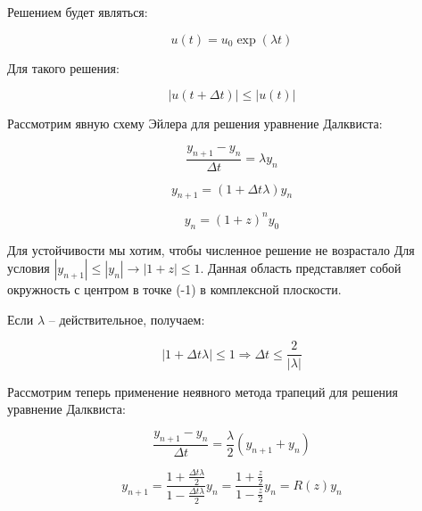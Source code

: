 \documentclass[10pt,a4paper]{article}
\begin{document}
		Решением будет являться:
		
		\begin{equation}
			u\left(t\right) = u_{0}\exp\left(\lambda t\right)
		\end{equation}
		
		Для такого решения:
		
		\begin{equation}
			\left|u\left(t + \Delta t\right)\right|\leqslant \left|
			u\left(t\right)\right|
		\end{equation}
		
		Рассмотрим явную схему Эйлера для решения уравнение Далквиста:
		
		\begin{equation}
			\frac{y_{n + 1} - y_{n}}{\Delta t} = \lambda y_{n}
		\end{equation}
		
		\begin{equation}
			y_{n + 1} = \left(1 + \Delta t\lambda\right)y_{n}
		\end{equation}
		
		\begin{equation}
			y_{n} = \left(1 + z\right)^{n}y_{0}
		\end{equation}
		
		
		Для устойчивости мы хотим, чтобы численное решение не возрастало
		Для условия $\left|y_{n + 1}\right| \leqslant \left|y_{n}\right|
		\rightarrow \left|1 + z\right|\leqslant 1$. Данная область представляет 
		собой окружность с центром в точке (-1) в комплексной плоскости.
		
		Если $\lambda$ -- действительное, получаем:
		
		\begin{equation}
			\left|1 + \Delta t\lambda\right| \leqslant 1 \Rightarrow \Delta t 
			\leqslant \frac{2}{\left|\lambda\right|}
		\end{equation}
		
		Рассмотрим теперь применение неявного метода трапеций для решения 
		уравнение Далквиста:
		
		\begin{equation}
			\frac{y_{n + 1} - y_{n}}{\Delta t} = \frac{\lambda}{2}\left(
			y_{n + 1} + y_{n}\right)
		\end{equation}
		
		\begin{equation}
			y_{n + 1} = \frac{1 + \frac{\Delta t \lambda}{2}}{1 - \frac{\Delta 
			t \lambda}{2}}y_{n} = \frac{1 + \frac{z}{2}}{1 - \frac{z}{2}}y_{n}
			= R\left(z\right)y_{n}
		\end{equation}
		
\end{document}
